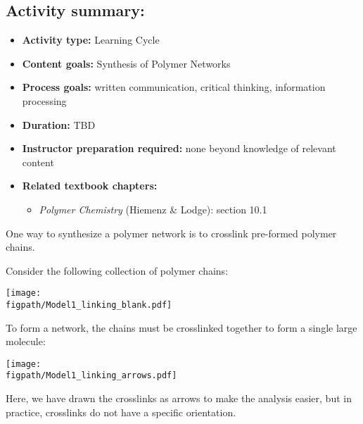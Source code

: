 \begin{activity}
\begin{instructornotes}
	\subsection*{Activity summary:}
	\begin{itemize}
		\item \textbf{Activity type:} Learning Cycle
		\item \textbf{Content goals:} Synthesis of Polymer Networks
		\item \textbf{Process goals:} %
			written communication, critical thinking, information processing
		\item \textbf{Duration:} TBD
		\item \textbf{Instructor preparation required:} none beyond knowledge of relevant content
		\item \textbf{Related textbook chapters:}
			\begin{itemize}
				\item \emph{Polymer Chemistry} (Hiemenz \& Lodge): section 10.1
			\end{itemize}
	\end{itemize}
	
\end{instructornotes}


\begin{model}
	\label{\labelbase:mdl:linking}

	One way to synthesize a polymer network is to crosslink pre-formed polymer chains.
	
	Consider the following collection of polymer chains:
	
	\centerline{\texttt{[image: \\figpath/Model1\_linking\_blank.pdf]}}
	
	To form a network, the chains must be crosslinked together to form a single large molecule:
	
	\centerline{\texttt{[image: \\figpath/Model1\_linking\_arrows.pdf]}}
	
	Here, we have drawn the crosslinks as arrows to make the analysis easier, but in practice, crosslinks do not have a specific orientation.
	

\end{model}
\end{activity}
